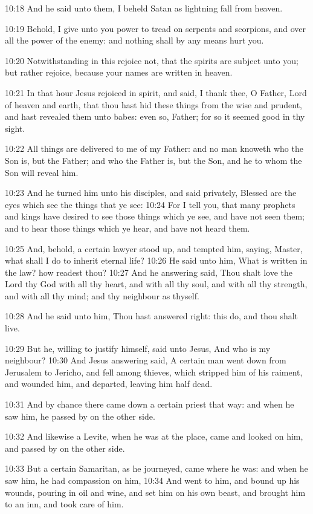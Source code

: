 10:18 And he said unto them, I beheld Satan as lightning fall from heaven.

10:19 Behold, I give unto you power to tread on serpents and scorpions, and over all the power of the enemy: and nothing shall by any means hurt you.

10:20 Notwithstanding in this rejoice not, that the spirits are subject unto you; but rather rejoice, because your names are written in heaven.

10:21 In that hour Jesus rejoiced in spirit, and said, I thank thee, O Father, Lord of heaven and earth, that thou hast hid these things from the wise and prudent, and hast revealed them unto babes: even so, Father; for so it seemed good in thy sight.

10:22 All things are delivered to me of my Father: and no man knoweth who the Son is, but the Father; and who the Father is, but the Son, and he to whom the Son will reveal him.

10:23 And he turned him unto his disciples, and said privately, Blessed are the eyes which see the things that ye see: 10:24 For I tell you, that many prophets and kings have desired to see those things which ye see, and have not seen them; and to hear those things which ye hear, and have not heard them.

10:25 And, behold, a certain lawyer stood up, and tempted him, saying, Master, what shall I do to inherit eternal life?  10:26 He said unto him, What is written in the law? how readest thou?  10:27 And he answering said, Thou shalt love the Lord thy God with all thy heart, and with all thy soul, and with all thy strength, and with all thy mind; and thy neighbour as thyself.

10:28 And he said unto him, Thou hast answered right: this do, and thou shalt live.

10:29 But he, willing to justify himself, said unto Jesus, And who is my neighbour?  10:30 And Jesus answering said, A certain man went down from Jerusalem to Jericho, and fell among thieves, which stripped him of his raiment, and wounded him, and departed, leaving him half dead.

10:31 And by chance there came down a certain priest that way: and when he saw him, he passed by on the other side.

10:32 And likewise a Levite, when he was at the place, came and looked on him, and passed by on the other side.

10:33 But a certain Samaritan, as he journeyed, came where he was: and when he saw him, he had compassion on him, 10:34 And went to him, and bound up his wounds, pouring in oil and wine, and set him on his own beast, and brought him to an inn, and took care of him.


